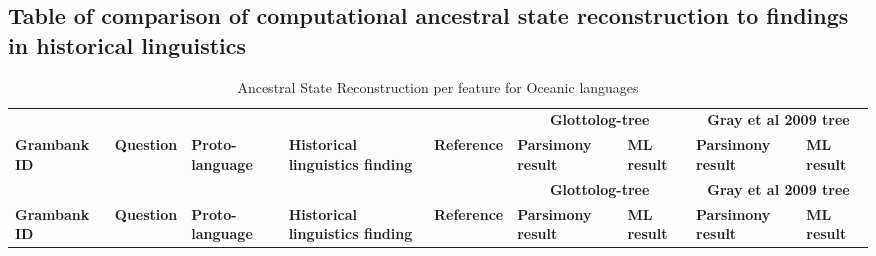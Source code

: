 \documentclass[draft,10pt]{article} %
\begin{document}
\subsection*{Table of comparison of computational ancestral state reconstruction to findings in historical linguistics}
\label{asr_table_appendic}
\singlespacing
\begin{landscape}
\begin{longtable}{| p{2cm}| p{3cm}| p{2.5cm}|p{2cm}|p{2cm}|p{2cm}|p{2cm}|p{2cm}|p{2cm}|}

\caption{{Ancestral State Reconstruction per feature for Oceanic languages}} \label{ASR_comparison_table} \\
\hline
& &&  &&  \multicolumn{2}{c|}{\textbf{Glottolog-tree}} &\multicolumn{2}{c|}{\textbf{Gray et al 2009 tree}}\\ \cline{6-9}
\textbf{Grambank ID}  & \textbf{Question} & \textbf{Proto-language} & \textbf{Historical linguistics finding}& \textbf{Reference} & \textbf{Parsimony result } & \textbf{ML result} & \textbf{Parsimony result } & \textbf{ML result} \\ 

\endfirsthead

\hline
& &&  &&  \multicolumn{2}{c|}{\textbf{Glottolog-tree}} &\multicolumn{2}{c|}{\textbf{Gray et al 2009 tree}}\\ \cline{6-9}
\textbf{Grambank ID}  & \textbf{Question} & \textbf{Proto-language} & \textbf{Historical linguistics finding}& \textbf{Reference} & \textbf{Parsimony result } & \textbf{ML result} & \textbf{Parsimony result } & \textbf{ML result} \\ 
\endhead


\end{longtable}
\end{landscape}
\end{document}
